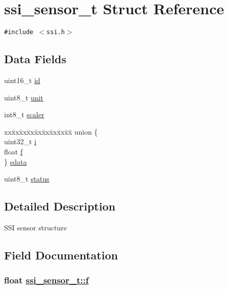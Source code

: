 \hypertarget{structssi__sensor__t}{
\section{ssi\_\-sensor\_\-t Struct Reference}
\label{structssi__sensor__t}
}
{\tt \#include $<$ssi.h$>$}

\subsection*{Data Fields}
\begin{CompactItemize}
\item 
uint16\_\-t \hyperlink{structssi__sensor__t_8b3e3e3f864d8e04c9b666a08ba20261}{id}
\item 
uint8\_\-t \hyperlink{structssi__sensor__t_a1f1ccefe0efae173472155afc32a384}{unit}
\item 
int8\_\-t \hyperlink{structssi__sensor__t_6bbdc857baffd97f4832a621c5b15343}{scaler}
\item 
\begin{tabbing}
xx\=xx\=xx\=xx\=xx\=xx\=xx\=xx\=xx\=\kill
union \{\\
\>uint32\_t \hyperlink{structssi__sensor__t_a775f2114a8d9f1dea8a0cf9e1ce37b1}{i}\\
\>float \hyperlink{structssi__sensor__t_cb3e2bf1d106593a0f2dd9c35c0cf0fa}{f}\\
\} \hyperlink{structssi__sensor__t_e3694c3eec6093c8a81844bd00206dd8}{sdata}\\

\end{tabbing}\item 
uint8\_\-t \hyperlink{structssi__sensor__t_3bd3afd85de5f062280f40b14a565328}{status}
\end{CompactItemize}


\subsection{Detailed Description}
SSI sensor structure 



\subsection{Field Documentation}
\hypertarget{structssi__sensor__t_cb3e2bf1d106593a0f2dd9c35c0cf0fa}{
\subsubsection[f]{\setlength{\rightskip}{0pt plus 5cm}float \hyperlink{structssi__sensor__t_cb3e2bf1d106593a0f2dd9c35c0cf0fa}{ssi\_\-sensor\_\-t::f}}}
\label{structssi__sensor__t_cb3e2bf1d106593a0f2dd9c35c0cf0fa}


